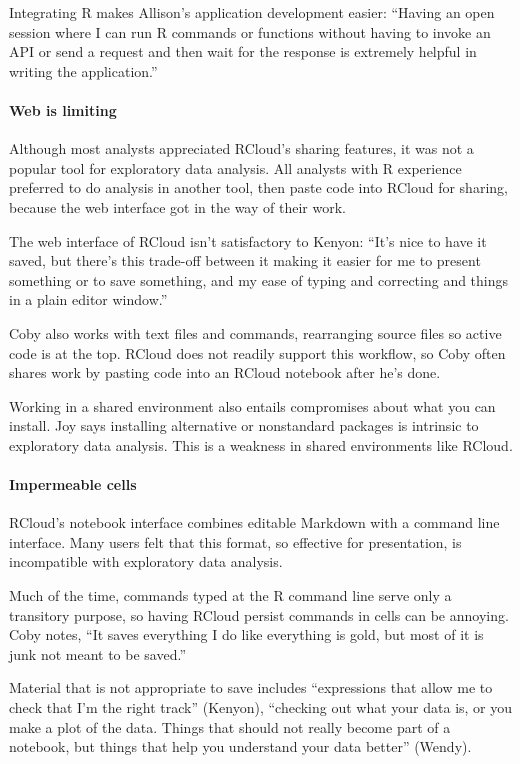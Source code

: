 Integrating R makes Allison's application development easier:
``Having an open session where I can run R commands or
functions without having to invoke an API or send a request and then
wait for the response is extremely helpful in writing the application.''

\paragraph*{Web is limiting} Although most analysts appreciated RCloud's sharing features,
it was not a popular tool for exploratory data analysis.
All analysts with R experience preferred to do analysis in another
tool, then paste code into RCloud for sharing, because the web interface got in the
way of their work.

The web interface of RCloud isn't satisfactory to Kenyon: ``It's nice to have
it saved, but there's this trade-off between it making it easier for me to
present something or to save something, and my ease of typing and
correcting and things in a plain editor window.''

Coby also works with text files and commands, rearranging source files
so active code is at the top. RCloud does not readily support this
workflow, so Coby often shares work by pasting code into an RCloud
notebook after he's done.

Working in a shared environment also entails compromises about what you can
install. Joy says installing alternative or nonstandard packages is
intrinsic to exploratory data analysis. This is a weakness in shared
environments like RCloud.

\paragraph*{Impermeable cells} RCloud's notebook interface combines editable
Markdown with a command line
interface. Many users felt that this format, so effective for presentation,
is incompatible with exploratory data analysis.

Much of the time, commands typed at the R command line serve only a transitory
purpose, so having RCloud persist commands in cells can be annoying.
Coby notes, ``It saves everything I do like everything is gold, but most
of it is junk not meant to be saved.''

Material that is not appropriate to save includes ``expressions that allow
me to check that I'm the right track'' (Kenyon), ``checking out what your data is,
or you make a plot of the data. Things that should not really become part of a
notebook, but things that help you understand your data better'' (Wendy).

